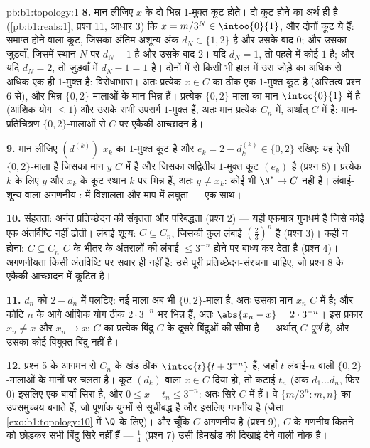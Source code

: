 \begin{solution}{pb:b1:topology:1}
\textbf{8.} मान लीजिए $x$ के दो भिन्न $1$-मुक्त कूट होते। दो कूट होने का
अर्थ ही है (\cref{pb:b1:reals:1}, प्रश्न 11, आधार $3$) कि $x = m/3^N \in
\intoo{0}{1}$, और दोनों कूट ये हैं: समाप्त होने वाला कूट, जिसका अंतिम अशून्य
अंक $d_N \in \{1, 2\}$ है और उसके बाद $0$; और उसका जुड़वाँ, जिसमें स्थान $N$
पर $d_N - 1$ है और उसके बाद $2$। यदि $d_N = 1$, तो पहले में कोई $1$ है; और
यदि $d_N = 2$, तो जुड़वाँ में $d_N - 1 = 1$ है। दोनों में से किसी भी हाल में
उस जोड़े का अधिक से अधिक एक ही $1$-मुक्त है: विरोधाभास। अतः प्रत्येक $x \in
C$ का ठीक एक $1$-मुक्त कूट है (अस्तित्व प्रश्न 6 से), और भिन्न
$\{0,2\}$-मालाओं के मान भिन्न हैं। प्रत्येक $\{0,2\}$-माला का मान
$\intcc{0}{1}$ में है (आंशिक योग $\leq 1$) और उसके सभी उपसर्ग $1$-मुक्त हैं,
अतः मान प्रत्येक $C_n$ में, अर्थात् $C$ में है: मान-प्रतिचित्रण
$\{0,2\}$-मालाओं से $C$ पर एकैकी आच्छादन है।

\textbf{9.} मान लीजिए $(d^{(k)})$ $x_k$ का $1$-मुक्त कूट है और $e_k = 2 -
d^{(k)}_k \in \{0, 2\}$ रखिए: यह ऐसी $\{0,2\}$-माला है जिसका मान $y$ $C$ में
है और जिसका अद्वितीय $1$-मुक्त कूट $(e_k)$ है (प्रश्न 8)। प्रत्येक $k$ के
लिए $y$ और $x_k$ के कूट स्थान $k$ पर भिन्न हैं, अतः $y \neq x_k$: कोई भी
 $\N^* \to C$  नहीं है। लंबाई-शून्य वाला अगणनीय :
 में विशालता और माप में लघुता --- एक साथ।

\textbf{10.} संहतता: अनंत प्रतिच्छेदन की संवृतता और परिबद्धता (प्रश्न 2) ---
यही एकमात्र गुणधर्म है जिसे कोई एक अंतर्विष्टि नहीं ढोती। लंबाई शून्य: $C
\subseteq C_n$, जिसकी कुल लंबाई $(\frac23)^n$ है (प्रश्न 3)। कहीं  न
होना: $C \subseteq C_n$ $C$ के भीतर के अंतरालों की लंबाई $\leq 3^{-n}$ होने
पर बाध्य कर देता है (प्रश्न 4)। अगणनीयता किसी अंतर्विष्टि पर सवार ही नहीं
है: उसे पूरी प्रतिच्छेदन-संरचना चाहिए, जो प्रश्न 8 के एकैकी आच्छादन में
कूटित है।

\textbf{11.} $d_n$ को $2 - d_n$ में पलटिए: नई माला अब भी $\{0,2\}$-माला है,
अतः उसका मान $x_n$ $C$ में है; और कोटि $n$ के आगे आंशिक योग ठीक
$2\cdot3^{-n}$ भर भिन्न हैं, अतः $\abs{x_n - x} = 2\cdot3^{-n}$। इस प्रकार
$x_n \neq x$ और $x_n \to x$: $C$ का प्रत्येक बिंदु $C$ के दूसरे बिंदुओं की
सीमा है --- अर्थात् $C$ \emph{पूर्ण} है, और उसका कोई वियुक्त बिंदु नहीं है।

\textbf{12.} प्रश्न 5 के आगमन से $C_n$ के खंड ठीक $\intcc{t}{t + 3^{-n}}$
हैं, जहाँ $t$ लंबाई-$n$ वाली $\{0,2\}$-मालाओं के मानों पर चलता है। कूट
$(d_k)$ वाला $x \in C$ दिया हो, तो कटाई $t_n$ (अंक $d_1 \dots d_n$, फिर $0$)
इसलिए एक बायाँ सिरा है, और $0 \leq x - t_n \leq 3^{-n}$: अतः सिरे $C$ में
 हैं। वे $\{m/3^n : m, n\}$ का उपसमुच्चय बनाते हैं, जो पूर्णांक युग्मों
से सूचीबद्ध है और इसलिए गणनीय है (जैसा \cref{exo:b1:topology:10} में $\Q$ के
लिए)। और चूँकि $C$ अगणनीय है (प्रश्न 9), $C$ के गणनीय कितने को छोड़कर सभी
बिंदु सिरे नहीं हैं --- $\frac14$ (प्रश्न 7) उसी हिमखंड की दिखाई देने वाली
नोक है।


\end{solution}

